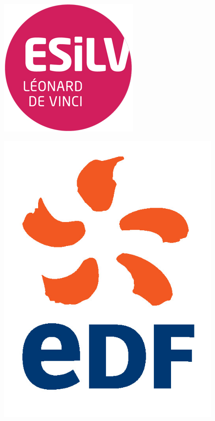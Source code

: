 \documentclass[12pt]{report}
\begin{document}
\begin{titlepage}
	
\newcommand{\HRule}{\rule{\linewidth}{0.5mm}} %

\begin{figure}
	\begin{minipage}[t]{.5\linewidth}
	\centering
	\includegraphics[scale=0.5]{esilv_logo.png}\\[1cm] 
	\end{minipage} 
	\begin{minipage}[t]{.5\linewidth}
	\includegraphics[scale=1.4]{edf_logo.png}\\[1cm]
	\end{minipage} 
\end{figure}


\end{titlepage}
\end{document}
